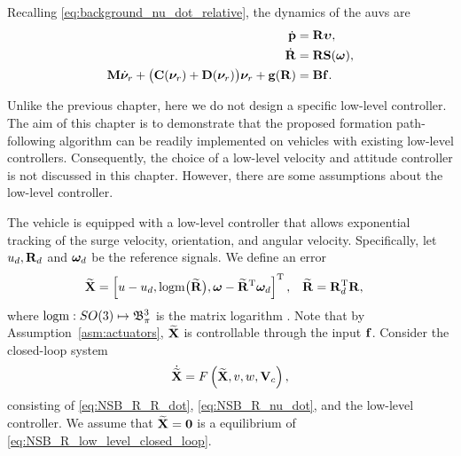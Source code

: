Recalling \eqref{eq:background_nu_dot_relative}, the dynamics of the \glspl{auv} are
\begin{subequations}
\begin{align}
    \dot{\mat{p}} &= \mat{R} \bvel, \label{eq:NSB_R_p_dot}\\
    \dot{\mat{R}} &= \mat{R} \mat{S}(\bs{\omega}), \label{eq:NSB_R_R_dot} \\
    \mat{M} \dot{\vel}_r
        + \bigl(\mat{C}(\vel_r) + \mat{D}(\vel_r)\bigr) \vel_r + \mat{g}(\mat{R}) &= \mat{B}\mat{f}. \label{eq:NSB_R_nu_dot}
\end{align} \label{eq:NSB_R_matrix_vector_model}
\end{subequations}

Unlike the previous chapter, here we do not design a specific low-level controller.
The aim of this chapter is to demonstrate that the proposed formation path-following algorithm can be readily implemented on vehicles with existing low-level controllers.
Consequently, the choice of a low-level velocity and attitude controller is not discussed in this chapter.
However, there are some assumptions about the low-level controller.

\begin{asm}
    \label{ass5}
    The vehicle is equipped with a low-level controller that allows exponential tracking of the surge velocity, orientation, and angular velocity.
    Specifically, let $u_d, \mat{R}_d$ and $\bs{\omega}_d$ be the reference signals.
    We define an error 
    \begin{align}
        \widetilde{\mat{X}} &= \inlinevector{u - u_d, {\rm logm}\bigl(\widetilde{\mat{R}}\bigr), \bs{\omega} - \widetilde{\mat{R}}\T\bs{\omega}_d}, &
        \widetilde{\mat{R}} &= \mat{R}_d\T\mat{R}, \label{eq:NSB_R_low_level_error}
    \end{align}
    where ${\rm logm} : SO(3) \mapsto \ball[3]{\pi}$ is the matrix logarithm \cite{iserles_lie_2000}.
    Note that by Assumption~\ref{asm:actuators}, $\widetilde{\mat{X}}$ is controllable through the input $\mat{f}$.
    Consider the closed-loop system 
    \begin{equation}
        \dot{\widetilde{\mat{X}}} = F \left( \widetilde{\mat{X}}, v, w, \ocean \right), \label{eq:NSB_R_low_level_closed_loop}
    \end{equation}
    consisting of \eqref{eq:NSB_R_R_dot}, \eqref{eq:NSB_R_nu_dot}, and the low-level controller.
    We assume that $\widetilde{\mat{X}} = \mat{0}$ is a  equilibrium of \eqref{eq:NSB_R_low_level_closed_loop}.
\end{asm}

